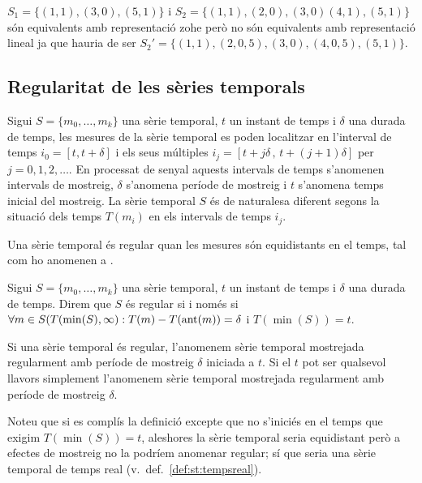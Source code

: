 $S_1=\{(1,1),(3,0),(5,1)\}$ i $S_2=\{(1,1),(2,0),(3,0)(4,1),(5,1)\}$ són equivalents amb representació zohe però no són equivalents amb representació lineal ja que hauria de ser $S_2'=\{(1,1),(2, 0{,}5 ),(3,0),(4, 0{,}5),(5,1)\}$. 















\subsection{Regularitat de les sèries temporals} 


Sigui $S=\{m_0,\ldots,m_k\}$ una sèrie temporal, $t$ un instant de
temps i $\delta$ una durada de temps, les mesures de la sèrie temporal
es poden localitzar en l'interval de temps $i_0=[t,t+\delta]$ i els
seus múltiples $i_j=[t+j\delta \,,\, t+(j+1)\delta]$ per $j=0,1,2,\ldots$.
En processat de senyal aquests intervals de temps s'anomenen intervals
de mostreig, $\delta$ s'anomena període de mostreig i $t$ s'anomena
temps inicial del mostreig.  La sèrie temporal $S$ és de naturalesa
diferent segons la situació dels temps $T(m_i)$ en els intervals de
temps $i_j$.

Una sèrie temporal és regular quan les mesures són equidistants en el
temps, tal com ho anomenen a \cite{last:hetland}.

\begin{definition}
  \label{def:st:regular}
  Sigui $S=\{m_0,\ldots,m_k\}$ una sèrie temporal, $t$ un instant de
  temps i $\delta$ una durada de temps. Direm que $S$ és regular si i
  només si $\forall m \in S(T(\min(S),\infty):T(m) - T(\operatorname*{ant}(m)) =
  \delta$ i $T(\min(S))=t$.
\end{definition}

Si una sèrie temporal és regular, l'anomenem sèrie temporal mostrejada
regularment amb període de mostreig $\delta$ iniciada a $t$. Si el $t$
pot ser qualsevol llavors simplement l'anomenem sèrie temporal
mostrejada regularment amb període de mostreig $\delta$.

Noteu que si es complís
la definició excepte que no s'iniciés en el temps que exigim
$T(\min(S))=t$, aleshores la sèrie temporal seria equidistant però a
efectes de mostreig no la podríem anomenar regular; sí que seria una
sèrie temporal de temps real (v.\ def.~\ref{def:st:tempsreal}).


